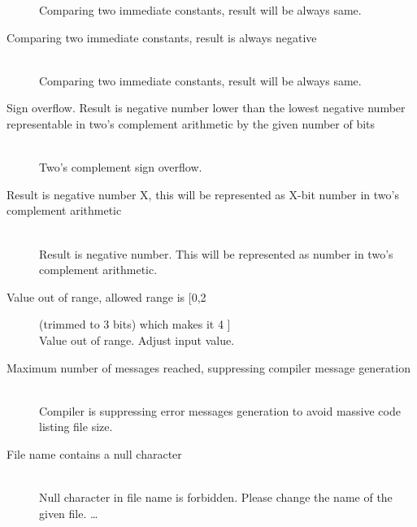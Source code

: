\begin{description}
                    Comparing two immediate constants, result will be always same.
                    \item[Comparing two immediate constants, result is always negative] \hfill \\
                    Comparing two immediate constants, result will be always same.
                    \item[Sign overflow. Result is negative number lower than the lowest negative number representable in two's complement arithmetic by the given number of bits ] \hfill \\
                    Two's complement sign overflow.
                    \item[Result is negative number X, this will be represented as X-bit number in two's complement arithmetic] \hfill \\
                    Result is negative number. This will be represented as number in two's complement arithmetic.
                    \item[Value out of range, allowed range is [0,2] (trimmed to 3 bits) which makes it 4 ] \hfill \\
                    Value out of range. Adjust input value.                                                  
                    \item[Maximum number of messages reached, suppressing compiler message generation ] \hfill \\
                    Compiler is suppressing error messages generation to avoid massive code listing file size.
                    \item[File name contains a null character ] \hfill \\
                    Null character in file name is forbidden. Please change the name of the given file.
                    \ldots
                    \end{description}

